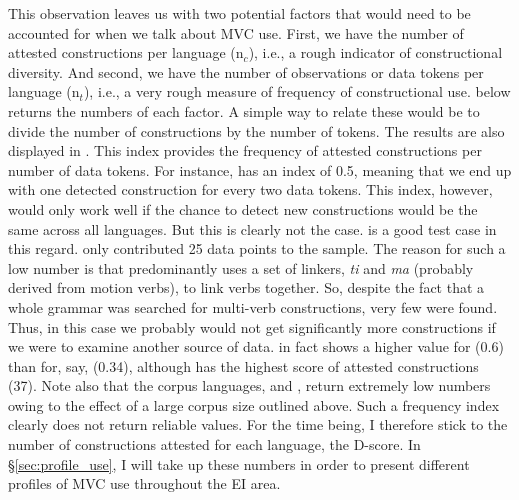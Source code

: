 This observation leaves us with two potential factors that would need to be accounted for when we talk about MVC use. First, we have the number of attested constructions per language (n$_c$), i.e., a rough indicator of constructional diversity. And second, we have the number of observations or data tokens per language (n$_t$), i.e., a very rough measure of frequency of constructional use.  below returns the numbers of each factor. A simple way to relate these would be to divide the number of constructions by the number of tokens. The results are also displayed in . This index provides the frequency of attested constructions per number of data tokens. For instance,  has an index of 0.5, meaning that we end up with one detected construction for every two data tokens. This index, however, would only work well if the chance to detect new constructions would be the same across all languages. But this is clearly not the case.  is a good test case in this regard.  only contributed 25 data points to the sample. The reason for such a low number is that  predominantly uses a set of linkers, \textit{ti} and \textit{ma} (probably derived from motion verbs), to link verbs together. So, despite the fact that a whole grammar was searched for multi-verb constructions, very few were found. Thus, in this case we probably would not get significantly more constructions if we were to examine another source of  data.  in fact shows a higher value for  (0.6) than for, say,  (0.34), although  has the highest score of attested constructions (37). Note also that the corpus languages,  and , return extremely low numbers owing to the effect of a large corpus size outlined above. Such a frequency index clearly does not return reliable values. For the time being, I therefore stick to the number of constructions attested for each language, the D-score. In §\ref{sec:profile_use}, I will take up these numbers in order to present different profiles of MVC use throughout the EI area.

